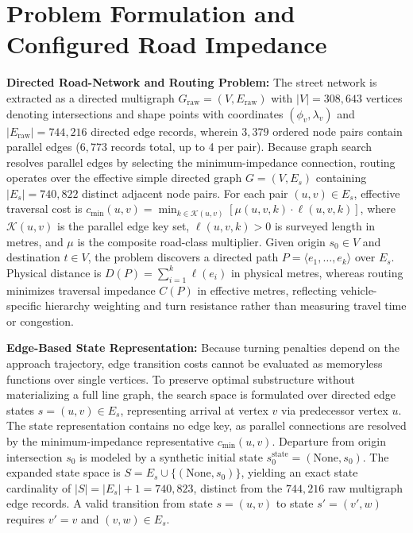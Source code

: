 \documentclass[conference]{IEEEtran}
\begin{document}
\section{Problem Formulation and Configured Road Impedance}

\noindent\textbf{Directed Road-Network and Routing Problem:} The street network is extracted as a directed multigraph $G_{\text{raw}} = (V, E_{\text{raw}})$ with $|V| = 308,643$ vertices denoting intersections and shape points with coordinates $(\phi_v, \lambda_v)$ and $|E_{\text{raw}}| = 744,216$ directed edge records, wherein $3,379$ ordered node pairs contain parallel edges ($6,773$ records total, up to 4 per pair). Because graph search resolves parallel edges by selecting the minimum-impedance connection, routing operates over the effective simple directed graph $G = (V, E_s)$ containing $|E_s| = 740,822$ distinct adjacent node pairs. For each pair $(u, v) \in E_s$, effective traversal cost is $c_{\min}(u, v) = \min_{k \in \mathcal{K}(u, v)} \left[ \mu(u, v, k) \cdot \ell(u, v, k) \right]$, where $\mathcal{K}(u, v)$ is the parallel edge key set, $\ell(u, v, k) > 0$ is surveyed length in metres, and $\mu$ is the composite road-class multiplier. Given origin $s_0 \in V$ and destination $t \in V$, the problem discovers a directed path $P = \langle e_1, \dots, e_k \rangle$ over $E_s$. Physical distance is $D(P) = \sum_{i=1}^k \ell(e_i)$ in physical metres, whereas routing minimizes traversal impedance $C(P)$ in effective metres, reflecting vehicle-specific hierarchy weighting and turn resistance rather than measuring travel time or congestion.

\noindent\textbf{Edge-Based State Representation:} Because turning penalties depend on the approach trajectory, edge transition costs cannot be evaluated as memoryless functions over single vertices. To preserve optimal substructure without materializing a full line graph, the search space is formulated over directed edge states $s = (u, v) \in E_s$, representing arrival at vertex $v$ via predecessor vertex $u$. The state representation contains no edge key, as parallel connections are resolved by the minimum-impedance representative $c_{\min}(u, v)$. Departure from origin intersection $s_0$ is modeled by a synthetic initial state $s_0^{\text{state}} = (\text{None}, s_0)$. The expanded state space is $S = E_s \cup \{(\text{None}, s_0)\}$, yielding an exact state cardinality of $|S| = |E_s| + 1 = 740,823$, distinct from the $744,216$ raw multigraph edge records. A valid transition from state $s = (u, v)$ to state $s' = (v', w)$ requires $v' = v$ and $(v, w) \in E_s$.
\end{document}

